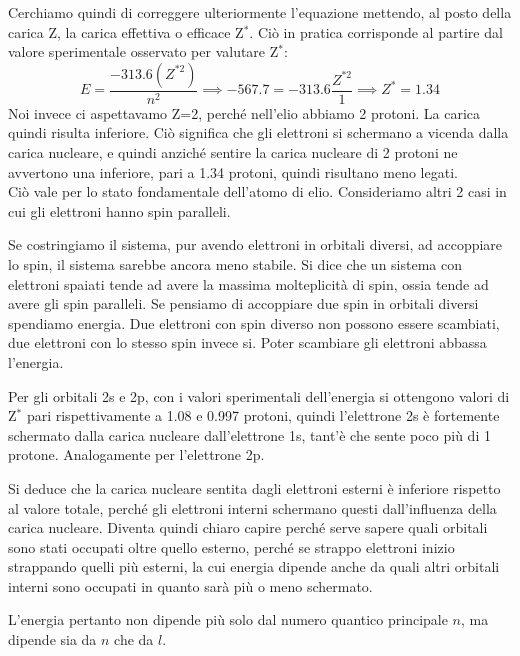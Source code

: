 Cerchiamo quindi di correggere ulteriormente l'equazione mettendo, al posto della carica Z, la carica effettiva o efficace Z$^*$. Ciò in pratica corrisponde al partire dal valore sperimentale osservato per valutare Z$^*$:
$$E=\frac{-313.6(Z^{*2})}{n^2} \implies -567.7=-313.6\frac{Z^{*2}}{1} \implies Z^*=1.34$$
Noi invece ci aspettavamo Z=2, perché nell'elio abbiamo 2 protoni. La carica quindi risulta inferiore. Ciò significa che gli elettroni si schermano a vicenda dalla carica nucleare, e quindi anziché sentire la carica nucleare di 2 protoni ne avvertono una inferiore, pari a 1.34 protoni, quindi risultano meno legati.\\

Ciò vale per lo stato fondamentale dell'atomo di elio. Consideriamo altri 2 casi in cui gli elettroni hanno spin paralleli.

Se costringiamo il sistema, pur avendo elettroni in orbitali diversi, ad accoppiare lo spin, il sistema sarebbe ancora meno stabile. Si dice che un sistema con elettroni spaiati tende ad avere la massima molteplicità di spin, ossia tende ad avere gli spin paralleli. Se pensiamo di accoppiare due spin in orbitali diversi spendiamo energia.
Due elettroni con spin diverso non possono essere scambiati, due elettroni con lo stesso spin invece si. Poter scambiare gli elettroni abbassa l'energia.

Per gli orbitali 2s e 2p, con i valori sperimentali dell'energia si ottengono valori di Z$^*$ pari rispettivamente a 1.08 e 0.997 protoni, quindi l'elettrone 2s è fortemente schermato dalla carica nucleare dall'elettrone 1s, tant'è che sente poco più di 1 protone. Analogamente per l'elettrone 2p.

Si deduce che la carica nucleare sentita dagli elettroni esterni è inferiore rispetto al valore totale, perché gli elettroni interni schermano questi dall'influenza della carica nucleare. Diventa quindi chiaro capire perché serve sapere quali orbitali sono stati occupati oltre quello esterno, perché se strappo elettroni inizio strappando quelli più esterni, la cui energia dipende anche da quali altri orbitali interni sono occupati in quanto sarà più o meno schermato.

L'energia pertanto non dipende più solo dal numero quantico principale $n$, ma dipende sia da $n$ che da $l$.

